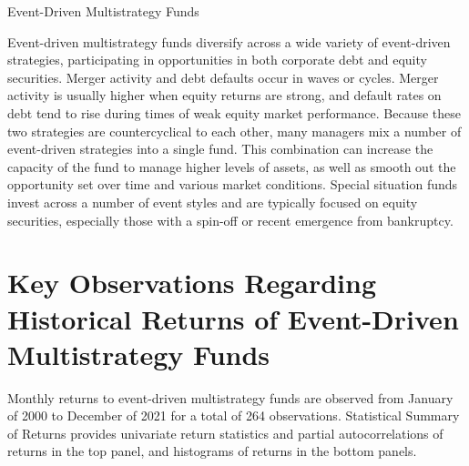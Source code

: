 \documentclass[11pt]{article}
\begin{document}
Event-Driven Multistrategy Funds

Event-driven multistrategy funds diversify across a wide variety of event-driven strategies, participating in opportunities in both corporate debt and equity securities. Merger activity and debt defaults occur in waves or cycles. Merger activity is usually higher when equity returns are strong, and default rates on debt tend to rise during times of weak equity market performance. Because these two strategies are countercyclical to each other, many managers mix a number of event-driven strategies into a single fund. This combination can increase the capacity of the fund to manage higher levels of assets, as well as smooth out the opportunity set over time and various market conditions. Special situation funds invest across a number of event styles and are typically focused on equity securities, especially those with a spin-off or recent emergence from bankruptcy.

\section*{Key Observations Regarding Historical Returns of Event-Driven Multistrategy Funds}
Monthly returns to event-driven multistrategy funds are observed from January of 2000 to December of 2021 for a total of 264 observations. Statistical Summary of Returns provides univariate return statistics and partial autocorrelations of returns in the top panel, and histograms of returns in the bottom panels.
\end{document}

